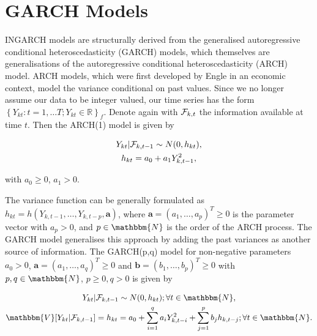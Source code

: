 
\section{GARCH Models}
\label{sec: Garch Models}

INGARCH models are structurally derived from the generalised autoregressive conditional heteroscedasticity (GARCH) models, which themselves are generalisations of the autoregressive conditional heteroscedasticity (ARCH) model. ARCH models, which were first developed by Engle \cite{Engle:1982} in an economic context, model the variance conditional on past values. Since we no longer assume our data to be integer valued, our time series has the form $\left\{Y_{kt}:t=1,\ldots T; Y_{kt} \in \mathbb{R}\right\}_f$. Denote again with $\mathcal{F}_{k,t}$ the information available at time $t$. Then the ARCH(1) model is given by \cite{Engle:1982}

\begin{equation}
\begin{gathered}
Y_{kt} | \mathcal{F}_{k,t-1} \sim N(0,h_{kt}),\\
h_{kt} = a_0 + a_1 Y_{k,t-1}^2,
\label{eq:ARCH model}
\end{gathered}
\end{equation}

with $a_0\geq0$, $a_1>0$. 

The variance function can be generally formulated as $h_{kt} = h(Y_{k,t-1},\ldots,Y_{k,t-p},\bm{a})$, where $\bm{a}=(a_1,\ldots,a_p)^T\geq 0$ is the parameter vector with $a_p>0$, and $p \in \mathbbm{N}$ is the order of the ARCH process. 
The GARCH model generalises this approach by adding the past variances as another source of information. The GARCH(p,q) model for non-negative parameters $a_0>0$, $\bm{a}=(a_1,\ldots,a_q)^T\geq 0$ and $\bm{b}=(b_1,\ldots,b_p)^T\geq0$ with $p,q \in \mathbbm{N}$, $p\geq0, q>0$ is given by \cite{Bollerslev:1986}

\begin{equation}
\begin{gathered}
Y_{kt} | \SigA_{k,t-1} \sim N(0,h_{kt}); \forall t \in \mathbbm{N}, \\
\mathbbm{V}[Y_{kt}|\SigA_{k,t-1}]=h_{kt} = a_0 + \sum_{i=1}^q a_i Y_{k,t-i}^2 + \sum_{j=1}^p b_j h_{k,t-j};\forall t \in \mathbbm{N}.
\label{eq:GARCH model}
\end{gathered}
\end{equation}

